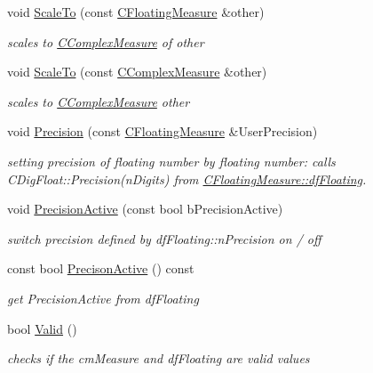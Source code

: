 \begin{DoxyCompactItemize}
void \hyperlink{classCFloatingMeasure_aa0a16f8516d047576b588389504c0996}{Scale\+To} (const \hyperlink{classCFloatingMeasure}{C\+Floating\+Measure} \&other)
\begin{DoxyCompactList}\small\item\em scales to \hyperlink{classCComplexMeasure}{C\+Complex\+Measure} of other \end{DoxyCompactList}\item 
void \hyperlink{classCFloatingMeasure_a841b94d2883274e67999688fad40d538}{Scale\+To} (const \hyperlink{classCComplexMeasure}{C\+Complex\+Measure} \&other)
\begin{DoxyCompactList}\small\item\em scales to \hyperlink{classCComplexMeasure}{C\+Complex\+Measure} other \end{DoxyCompactList}\item 
void \hyperlink{classCFloatingMeasure_abaedeff78fb7009c788df5a016bc46d5}{Precision} (const \hyperlink{classCFloatingMeasure}{C\+Floating\+Measure} \&User\+Precision)
\begin{DoxyCompactList}\small\item\em setting precision of floating number by floating number\+: calls C\+Dig\+Float\+::\+Precision(n\+Digits) from \hyperlink{classCFloatingMeasure_aa0cec9966c6c08db75c493e44396cfc2}{C\+Floating\+Measure\+::df\+Floating}. \end{DoxyCompactList}\item 
void \hyperlink{classCFloatingMeasure_a4fe4d60589da6d4c7f09cb09fbea730b}{Precision\+Active} (const bool b\+Precision\+Active)
\begin{DoxyCompactList}\small\item\em switch precision defined by df\+Floating\+::n\+Precision on / off \end{DoxyCompactList}\item 
const bool \hyperlink{classCFloatingMeasure_a90d47ac476295db3c208cb484cd75764}{Precison\+Active} () const
\begin{DoxyCompactList}\small\item\em get Precision\+Active from df\+Floating \end{DoxyCompactList}\item 
bool \hyperlink{classCFloatingMeasure_a0ff3ae036cd2ee44d6b2eadc609b1d1a}{Valid} ()
\begin{DoxyCompactList}\small\item\em checks if the cm\+Measure and df\+Floating are valid values \end{DoxyCompactList}\item 

\end{DoxyCompactItemize}
